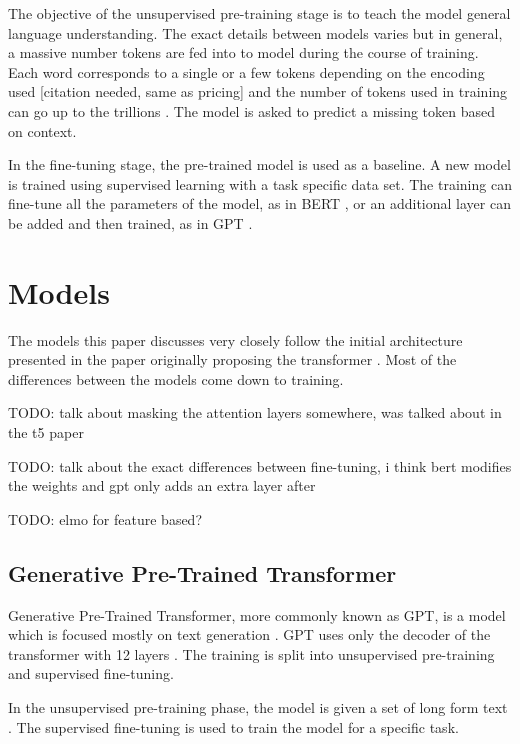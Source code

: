 \documentclass[twoside]{article}
\begin{document}
The objective of the unsupervised pre-training stage is to teach the model
general language understanding. The exact details between models varies but
in general, a massive number tokens are fed into to model during the course
of training. Each word corresponds to a single or a few tokens depending on 
the encoding used [citation needed, same as pricing] and the number of tokens
used in training can go up to the trillions \cite{raffel_exploring_2020}. 
The model is asked to predict a missing token based on context. 

In the fine-tuning stage, the pre-trained model is used as a baseline. A new
model is trained using supervised learning with a task specific data set. 
The training can fine-tune all the parameters of the model, as in BERT 
\cite{devlin_bert_2019}, or an additional layer can be added and then
trained, as in GPT \cite{radford_improving_nodate}.

\section{Models}

The models this paper discusses very closely follow the initial architecture
presented in the paper originally proposing the transformer 
\cite{vaswani_attention_2017}. Most of the differences between 
the models come down to training.

TODO: talk about masking the attention layers somewhere, was talked about in
the t5 paper

TODO: talk about the exact differences between fine-tuning,
i think bert modifies the weights and gpt only adds an extra layer after

TODO: elmo for feature based?

\subsection{Generative Pre-Trained Transformer}
Generative Pre-Trained Transformer, more commonly known as GPT, is a model
which is focused mostly on text generation \cite{brown_language_2020}. 
GPT uses only the decoder of the transformer with 12 layers 
\cite{radford_improving_nodate}. The training is split into unsupervised
pre-training and supervised fine-tuning. 

In the unsupervised pre-training phase, the model is given a set of long form text
\cite{radford_improving_nodate}. The supervised fine-tuning is used to train the
model for a specific task. 
\end{document}
